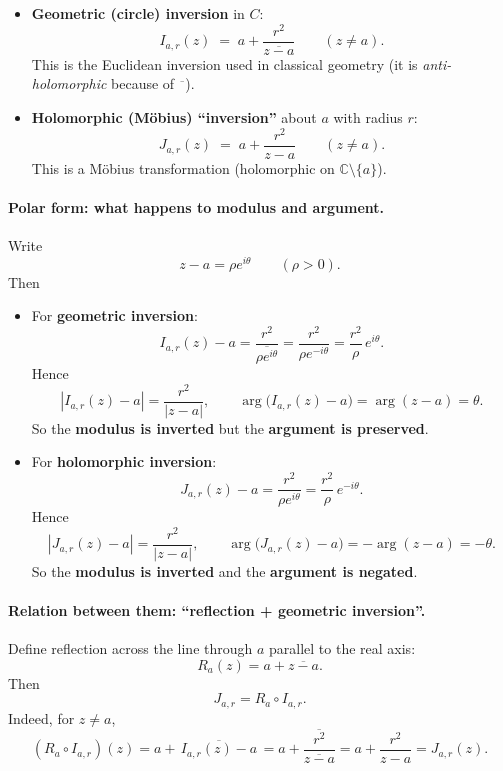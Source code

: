 \documentclass[12pt,a4paper]{article}
\newcommand{\C}{\mathbb{C}}
\theoremstyle{plain}
\theoremstyle{definition}      %
\begin{document}
\begin{itemize}
	\item \textbf{Geometric (circle) inversion} in $C$:
	\[
	I_{a,r}(z)\;=\;a+\frac{r^{2}}{\overline{z-a}}
	\qquad (z\neq a).
	\]
	This is the Euclidean inversion used in classical geometry (it is \emph{anti-holomorphic} because of $\overline{\phantom{z}}$).
	
	\item \textbf{Holomorphic (Möbius) “inversion”} about $a$ with radius $r$:
	\[
	J_{a,r}(z)\;=\;a+\frac{r^{2}}{z-a}
	\qquad (z\neq a).
	\]
	This is a Möbius transformation (holomorphic on $\C\setminus\{a\}$).
\end{itemize}

\paragraph{\textbf{Polar form: what happens to modulus and argument.}}
Write
\[
z-a=\rho e^{i\theta}\qquad(\rho>0).
\]
Then

\begin{itemize}
	\item For \textbf{geometric inversion}:
	\[
	I_{a,r}(z)-a=\frac{r^{2}}{\overline{\rho e^{i\theta}}}
	=\frac{r^{2}}{\rho e^{-i\theta}}
	=\frac{r^{2}}{\rho}\,e^{i\theta}.
	\]
	Hence
	\[
	|I_{a,r}(z)-a|=\frac{r^{2}}{|z-a|},\qquad
	\arg\bigl(I_{a,r}(z)-a\bigr)=\arg(z-a)=\theta.
	\]
	So the \textbf{modulus is inverted} but the \textbf{argument is preserved}.
	
	\item For \textbf{holomorphic inversion}:
	\[
	J_{a,r}(z)-a=\frac{r^{2}}{\rho e^{i\theta}}
	=\frac{r^{2}}{\rho}\,e^{-i\theta}.
	\]
	Hence
	\[
	|J_{a,r}(z)-a|=\frac{r^{2}}{|z-a|},\qquad
	\arg\bigl(J_{a,r}(z)-a\bigr)=-\arg(z-a)=-\theta.
	\]
	So the \textbf{modulus is inverted} and the \textbf{argument is negated}.
\end{itemize}

\paragraph{\textbf{Relation between them: “reflection + geometric inversion”.}}
Define reflection across the line through $a$ parallel to the real axis:
\[
R_a(z)=a+\overline{z-a}.
\]
Then
\[
J_{a,r}=R_a\circ I_{a,r}.
\]
Indeed, for $z\neq a$,
\[
(R_a\circ I_{a,r})(z)
=a+\overline{\,I_{a,r}(z)-a\,}
=a+\overline{\frac{r^{2}}{\overline{z-a}}}
=a+\frac{r^{2}}{z-a}
=J_{a,r}(z).
\]

\end{document}
